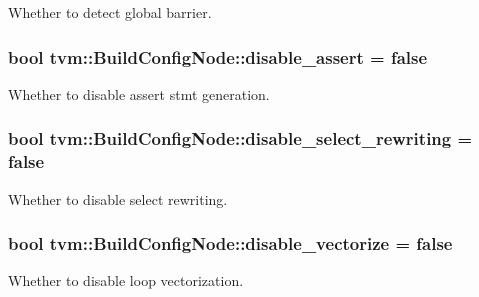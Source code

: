 Whether to detect global barrier. 

\subsubsection[{\texorpdfstring{disable\+\_\+assert}{disable_assert}}]{\setlength{\rightskip}{0pt plus 5cm}bool tvm\+::\+Build\+Config\+Node\+::disable\+\_\+assert = false}\hypertarget{classtvm_1_1BuildConfigNode_ab44ea7dd076903dafb212210ef5f71a6}{}\label{classtvm_1_1BuildConfigNode_ab44ea7dd076903dafb212210ef5f71a6}


Whether to disable assert stmt generation. 

\subsubsection[{\texorpdfstring{disable\+\_\+select\+\_\+rewriting}{disable_select_rewriting}}]{\setlength{\rightskip}{0pt plus 5cm}bool tvm\+::\+Build\+Config\+Node\+::disable\+\_\+select\+\_\+rewriting = false}\hypertarget{classtvm_1_1BuildConfigNode_a2a8903e47165c194c23b99873e8e7e5d}{}\label{classtvm_1_1BuildConfigNode_a2a8903e47165c194c23b99873e8e7e5d}


Whether to disable select rewriting. 

\subsubsection[{\texorpdfstring{disable\+\_\+vectorize}{disable_vectorize}}]{\setlength{\rightskip}{0pt plus 5cm}bool tvm\+::\+Build\+Config\+Node\+::disable\+\_\+vectorize = false}\hypertarget{classtvm_1_1BuildConfigNode_ae8af930ce70dbe693f088293bf4fadce}{}\label{classtvm_1_1BuildConfigNode_ae8af930ce70dbe693f088293bf4fadce}


Whether to disable loop vectorization. 

